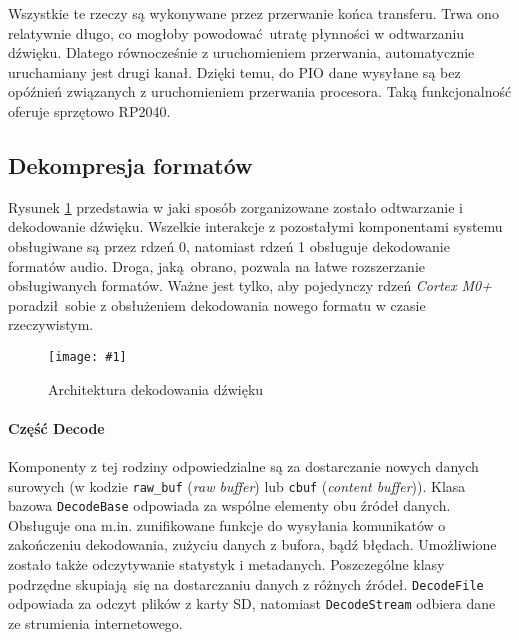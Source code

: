 \documentclass[polish]{aghengthesis}
\newcommand{\imgint}[4]{
	\begin{figure}[{#4}]
		\centering
		\texttt{[image: \#1]}
		\caption{#2}
		\label{#1}
	\end{figure}
}
\newcommand{\imgh}[3]{\imgint{#1}{#2}{#3}{H}}
\begin{document}
			Wszystkie te rzeczy są wykonywane przez przerwanie końca transferu.
			Trwa ono relatywnie długo, co mogłoby powodować utratę płynności w odtwarzaniu dźwięku.
			Dlatego równocześnie z uruchomieniem przerwania, automatycznie uruchamiany jest drugi kanał.
			Dzięki temu, do PIO dane wysyłane są bez opóźnień związanych z uruchomieniem przerwania procesora.
			Taką funkcjonalność oferuje sprzętowo RP2040.
		
		\subsection{Dekompresja formatów}
			\label{sec:decode}
			
			Rysunek \ref{3/PicoRadio-sound-decoding} przedstawia w jaki sposób zorganizowane zostało odtwarzanie i dekodowanie dźwięku. Wszelkie interakcje z pozostałymi komponentami systemu obsługiwane są przez rdzeń 0, natomiast rdzeń 1 obsługuje dekodowanie formatów audio. Droga, jaką obrano, pozwala na łatwe rozszerzanie obsługiwanych formatów. Ważne jest tylko, aby pojedynczy rdzeń \textit{Cortex M0+} poradził sobie z obsłużeniem dekodowania nowego formatu w czasie rzeczywistym.
			\imgh{3/PicoRadio-sound-decoding}{Architektura dekodowania dźwięku}{0.95}
			
		
			\paragraph{Część Decode}
				Komponenty z tej rodziny odpowiedzialne są za dostarczanie nowych danych surowych (w kodzie \lstinline|raw_buf| (\textit{raw buffer}) lub \lstinline|cbuf| (\textit{content buffer})). Klasa bazowa \lstinline|DecodeBase| odpowiada za wspólne elementy obu źródeł danych. Obsługuje ona m.in. zunifikowane funkcje do wysyłania komunikatów o zakończeniu dekodowania, zużyciu danych z bufora, bądź błędach. Umożliwione zostało także odczytywanie statystyk i metadanych. Poszczególne klasy podrzędne skupiają się na dostarczaniu danych z różnych źródeł. \lstinline|DecodeFile| odpowiada za odczyt plików z karty SD, natomiast \lstinline|DecodeStream| odbiera dane ze strumienia internetowego.
			
\end{document}
